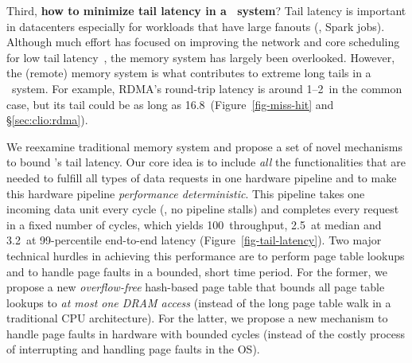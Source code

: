 Third, \textbf{how to minimize tail latency in a \md\ system}?
Tail latency is important in datacenters especially for workloads that have large fanouts (\eg, Spark jobs).
Although much effort has focused on improving the network and core scheduling for low tail latency~\cite{nanoPU,Shenango,Shinjuku,ZygOS,RPCValet},
the memory system has largely been overlooked.
However, the (remote) memory system is what contributes to extreme long tails in a \md\ system.
For example, RDMA's round-trip latency is around 1--2\mus\ in the common case,
but its tail could be as long as 16.8\ms\ (Figure~\ref{fig-miss-hit} and \S\ref{sec:clio:rdma}). %

We reexamine traditional memory system
and propose a set of novel mechanisms to bound \sys's tail latency.
Our core idea is to include {\em all} the functionalities that are needed to fulfill all types of data requests in one hardware pipeline
and to make this hardware pipeline {\em performance deterministic}.
This pipeline takes one incoming data unit every cycle (\ie, no pipeline stalls) and completes every request in a fixed number of cycles,
which yields 100\Gbps\ throughput, 2.5\mus\ at median and 3.2\mus\ at 99-percentile end-to-end latency (Figure~\ref{fig-tail-latency}).
Two major technical hurdles in achieving this performance are to perform page table lookups and to handle page faults in a bounded, short time period.  
For the former, we propose a new {\em overflow-free} hash-based page table that bounds all page table lookups to {\em at most one DRAM access} (instead of the long page table walk in a traditional CPU architecture).
For the latter, we propose a new mechanism to handle page faults in hardware with bounded cycles (instead of the costly process of interrupting and handling page faults in the OS).

\fi





